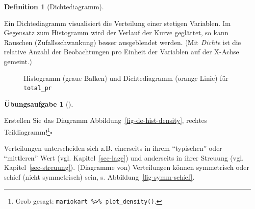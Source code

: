 \documentclass[
  letterpaper,
  twoside,
  open=any]{scrbook}
\theoremstyle{definition}
\newtheorem{exercise}{Übungsaufgabe}[chapter]
\theoremstyle{definition}
\theoremstyle{definition}
\newtheorem{definition}{Definition}[chapter]
\theoremstyle{remark}
\begin{document}
\begin{definition}[Dichtediagramm]\protect\hypertarget{def-dichtediagramm}{}\label{def-dichtediagramm}

Ein Dichtediagramm visualisiert die Verteilung einer stetigen Variablen.
Im Gegensatz zum Histogramm wird der Verlauf der Kurve geglättet, so
kann Rauschen (Zufallsschwankung) besser ausgeblendet werden. (Mit
\emph{Dichte} ist die relative Anzahl der Beobachtungen pro Einheit der
Variablen auf der X-Achse gemeint.)

\end{definition}

\begin{figure}


\caption{\label{fig-balken-total-pr-hist-dens}Histogramm (graue Balken)
und Dichtediagramm (orange Linie) für \texttt{total\_pr}}

\end{figure}%

\begin{exercise}[]\protect\hypertarget{exr-plot-density}{}\label{exr-plot-density}

Erstellen Sie das Diagramm Abbildung~\ref{fig-de-hist-density}, rechtes
Teildiagramm!\footnote{Grob gesagt:
  \texttt{mariokart\ \%\textgreater{}\%\ plot\_density()}.}\(\square\)

\end{exercise}

Verteilungen unterscheiden sich z.B. einerseits in ihrem
\enquote{typischen} oder \enquote{mittleren} Wert (vgl.
Kapitel~\ref{sec-lage}) und anderseits in ihrer Streuung (vgl.
Kapitel~\ref{sec-streuung}). (Diagramme von) Verteilungen können
symmetrisch oder schief (nicht symmetrisch) sein, s.
Abbildung~\ref{fig-symm-schief}.
\end{document}
